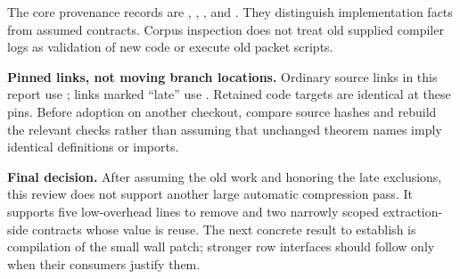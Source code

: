 The core provenance records are , , ,  and . They distinguish implementation facts from assumed contracts. Corpus inspection does not treat old supplied compiler logs as validation of new code or execute old packet scripts.

\textbf{Pinned links, not moving branch locations.} Ordinary source links in this report use ; links marked ``late'' use . Retained code targets are identical at these pins. Before adoption on another checkout, compare source hashes and rebuild the relevant checks rather than assuming that unchanged theorem names imply identical definitions or imports.

\textbf{Final decision.} After assuming the old work and honoring the late exclusions, this review does not support another large automatic compression pass. It supports five low-overhead lines to remove and two narrowly scoped extraction-side contracts whose value is reuse. The next concrete result to establish is compilation of the small wall patch; stronger row interfaces should follow only when their consumers justify them.
